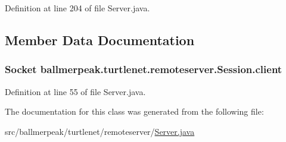 Definition at line 204 of file Server.\-java.



\subsection{Member Data Documentation}
\hypertarget{classballmerpeak_1_1turtlenet_1_1remoteserver_1_1Session_a2506d1b24e158edf2fcfd2a31d57f43a}{
\subsubsection[{client}]{\setlength{\rightskip}{0pt plus 5cm}Socket ballmerpeak.\-turtlenet.\-remoteserver.\-Session.\-client\hspace{0.3cm}{\ttfamily [private]}}}\label{classballmerpeak_1_1turtlenet_1_1remoteserver_1_1Session_a2506d1b24e158edf2fcfd2a31d57f43a}


Definition at line 55 of file Server.\-java.



The documentation for this class was generated from the following file\-:\begin{DoxyCompactItemize}
\item 
src/ballmerpeak/turtlenet/remoteserver/\hyperlink{Server_8java}{Server.\-java}\end{DoxyCompactItemize}
